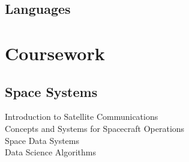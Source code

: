 \documentclass[]{deedy-resume-openfont}
\begin{document}
\begin{minipage}[t]{0.33\textwidth}
\subsection{Languages}

\section{Coursework}
\subsection{Space Systems}
Introduction to Satellite Communications \\
Concepts and Systems for Spacecraft Operations \\
Space Data Systems \\
Data Science Algorithms

%
%

\end{minipage}
\hfill
\end{document}
